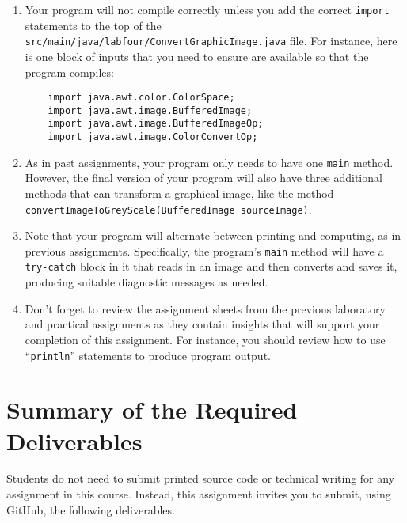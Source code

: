 \documentclass[11pt]{article}
\newcommand{\mainprogramsource}{\lstinline{src/main/java/labfour/ConvertGraphicImage.java}}
\newcommand{\command}[1]{``\lstinline{#1}''}
\newcommand{\program}[1]{\lstinline{#1}}
\begin{document}

\begin{enumerate}
  \setlength{\itemsep}{0pt}

\item Your program will not compile correctly unless you add the correct
  \program{import} statements to the top of the \mainprogramsource{} file. For
  instance, here is one block of inputs that you need to ensure are available so
  that the program compiles:

  \vspace*{-.1in}
  \begin{verbatim}
    import java.awt.color.ColorSpace;
    import java.awt.image.BufferedImage;
    import java.awt.image.BufferedImageOp;
    import java.awt.image.ColorConvertOp;
  \end{verbatim}
  \vspace*{-.25in}

\item As in past assignments, your program only needs to have one {\tt main}
  method. However, the final version of your program will also have three
  additional methods that can transform a graphical image, like the method
  \program{convertImageToGreyScale(BufferedImage sourceImage)}.

\item Note that your program will alternate between printing and computing, as
  in previous assignments. Specifically, the program's \program{main} method
  will have a \program{try-catch} block in it that reads in an image and then
  converts and saves it, producing suitable diagnostic messages as needed.

\item Don't forget to review the assignment sheets from the previous laboratory
  and practical assignments as they contain insights that will support your
  completion of this assignment. For instance, you should review how to use
  \command{println} statements to produce program output.

\end{enumerate}

\section*{Summary of the Required Deliverables}

\noindent Students do not need to submit printed source code or technical
writing for any assignment in this course. Instead, this assignment invites you
to submit, using GitHub, the following deliverables.
\end{document}
